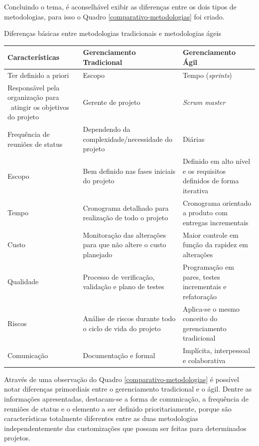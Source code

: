 Concluindo o tema, é aconselhável exibir as diferenças entre os dois tipos de metodologias, para isso o Quadro \ref{comparativo-metodologias} foi criado.

\begin{quadro}[h]
\centering
{}
\caption{Diferenças básicas entre metodologias tradicionais e metodologias ágeis}
\vspace{0.5cm}

\setlength{\extrarowheight}{0.25cm}
\begin{tabular}{|L|L|L|}
\hline
\textbf{Características} & \textbf{Gerenciamento Tradicional} & \textbf{Gerenciamento Ágil} \\ %
\hline
Ter definido a priori & Escopo & Tempo (\textit{sprints})\\
\hline
Responsável pela organização para \ atingir os objetivos do projeto & Gerente de projeto & \textit{Scrum master}\\
\hline
Frequência de reuniões de status & Dependendo da complexidade/necessidade do projeto & Diárias\\
\hline
Escopo & Bem definido nas fases iniciais do projeto & Definido em alto nível e os requisitos definidos de forma iterativa\\
\hline
Tempo & Cronograma detalhado para realização de todo o projeto & Cronograma orientado a produto com entregas incrementais\\
\hline
Custo & Monitoração das alterações para que não altere o custo planejado & Maior controle em função da rapidez em alterações\\
\hline
Qualidade & Processo de verificação, validação e plano de testes & Programação em pares, testes incrementais e refatoração\\
\hline
Riscos & Análise de riscos durante todo o ciclo de vida do projeto & Aplica-se o mesmo conceito do gerenciamento tradicional\\
\hline
Comunicação & Documentação e formal & Implícita, interpessoal e colaborativa\\

\hline
\end{tabular}
\label{comparativo-metodologias}
\end{quadro}


Através de uma observação do Quadro \ref{comparativo-metodologias} é possível notar diferenças primordiais entre o gerenciamento tradicional e o ágil. Dentre as informações apresentadas, destacam-se a forma de comunicação, a frequência de reuniões de status e o elemento a ser definido prioritariamente, porque são características totalmente diferentes entre as duas metodologias independentemente das customizações que possam ser feitas para determinados projetos. 

